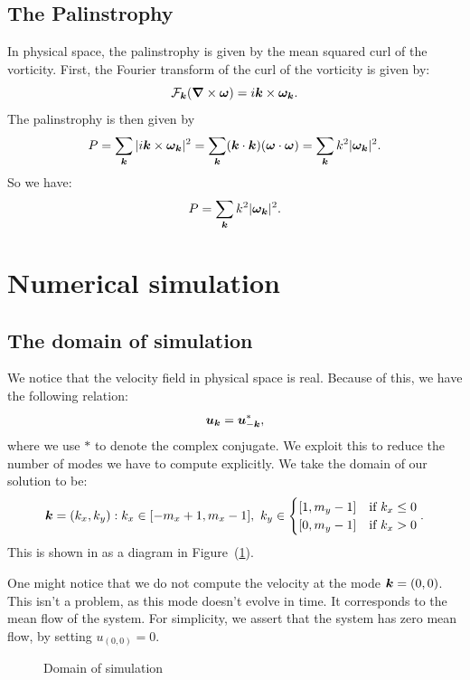 \documentclass[12pt]{article}
\def\v{\bm}
\def\vw{{\v\w}}
\begin{document}
\subsection{The Palinstrophy}
In physical space, the palinstrophy is given by the mean squared curl of the vorticity. First, the Fourier transform of the curl of the vorticity is given by:
$$\cal{F}_{\vk}(\grad\times \vw) = i\vk\times \vw_\vk.$$
The palinstrophy is then given by
$$P = \sum_{\vk} |i\vk\times \vw_\vk|^2 = \sum_{\vk} (\vk\cdot \vk ) (\vw\cdot \vw)   = \sum_{\vk} k^2|\vw_\vk|^2 .$$
So we have: 
$$P = \sum_{\vk} k^2|\vw_\vk|^2 .$$
\section{Numerical simulation}
\subsection{The domain of simulation}
We notice that the velocity field in physical space is real. Because of this, we have the following relation:
\begin{equation}
\vu_\vk = \vu_{-\vk}^*,
\end{equation}
where we use $*$ to denote the complex conjugate. We exploit this to reduce the number of modes we have to compute explicitly. 
We take the domain of our solution to be: 
$$
\vk = (k_x, k_y): k_x \in [-m_x + 1, m_x -1],\ k_y \in 
\begin{cases}
[1, m_y -1]&\text{if }k_x \leq 0\\
[0, m_y -1]&\text{if }k_x > 0\\
\end{cases}.
$$
This is shown in as a diagram in Figure~(\ref{domain}). 

One might notice that we do not compute the velocity at the mode $\vk = (0,0)$. This isn't a problem, as this mode doesn't evolve in time. It corresponds to the mean flow of the system. For simplicity, we assert that the system has zero mean flow, by setting $u_{(0,0)} = 0$.
\begin{figure}[ht]
\begin{center}
\caption{Domain of simulation}\label{domain}
\end{center}
\end{figure}
\newpage
\end{document}
